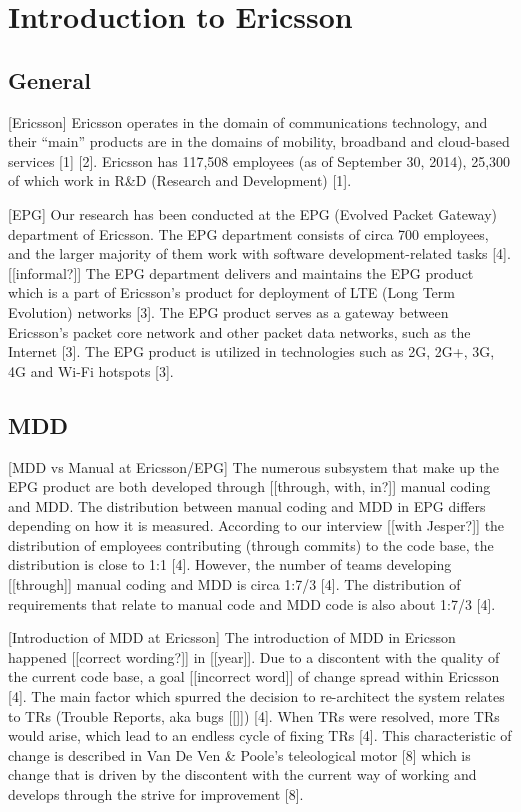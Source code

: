 \documentclass[fina_report_innit.tex]{subfiles}
\begin{document}
\section{Introduction to Ericsson}

\subsection*{General}
[Ericsson]
Ericsson operates in the domain of communications technology, and their “main” products are in the domains of mobility, broadband and cloud-based services [1] [2]. Ericsson has 117,508 employees (as of September 30, 2014), 25,300 of which work in R\&D (Research and Development) [1].

[EPG]
Our research has been conducted at the EPG (Evolved Packet Gateway) department of Ericsson. The EPG department consists of circa 700 employees, and the larger majority of them work with software development-related tasks [4]. [[informal?]]  The EPG department delivers and maintains the EPG product which is a part of Ericsson’s product for deployment of LTE (Long Term Evolution) networks [3]. The EPG product serves as a gateway between Ericsson’s packet core network and other packet data networks, such as the Internet [3]. The EPG product is utilized in technologies such as 2G, 2G+, 3G, 4G and Wi-Fi hotspots [3].

\subsection*{MDD}

[MDD vs Manual at Ericsson/EPG]
The numerous subsystem that make up the EPG product are both developed through [[through, with, in?]] manual coding and MDD. The distribution between manual coding and MDD in EPG differs depending on how it is measured. According to our interview [[with Jesper?]] the distribution of employees contributing (through commits) to the code base, the distribution is close to 1:1 [4]. However, the number of teams developing [[through]] manual coding and MDD is circa 1:7/3 [4]. The distribution of requirements that relate to manual code and MDD code is also about 1:7/3 [4].

[Introduction of MDD at Ericsson]
The introduction of MDD in Ericsson happened [[correct wording?]] in [[year]]. Due to a discontent with the quality of the current code base, a goal [[incorrect word]] of change spread within Ericsson [4]. The main factor which spurred the decision to re-architect the system relates to TRs (Trouble Reports, aka bugs [[]]) [4]. When TRs were resolved, more TRs would arise, which lead to an endless cycle of fixing TRs [4]. This characteristic of change is described in Van De Ven \& Poole’s teleological motor [8] which is change that is driven by the discontent with the current way of working and develops through the strive for improvement [8]. 
\end{document}
